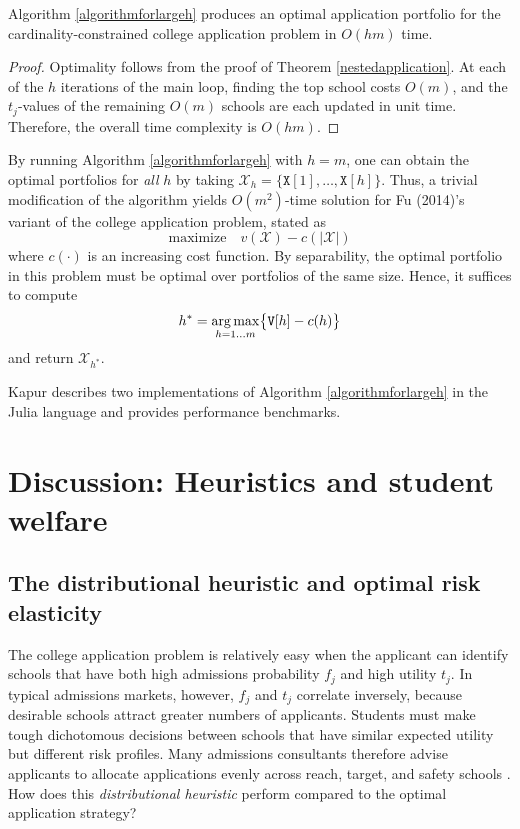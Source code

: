 \begin{theorem} \label{validityofalmaalgorithm}
Algorithm \ref{algorithmforlargeh} produces an optimal application portfolio for the cardinality-constrained college application problem in $O(h m)$ time.
\end{theorem}

\begin{proof}
Optimality follows from the proof of Theorem \ref{nestedapplication}. At each of the $h$ iterations of the main loop, finding the top school costs $O(m)$, and the $t_j$-values of the remaining $O(m)$ schools are each updated in unit time. Therefore, the overall time complexity is $O(h m)$.
\end{proof}

By running Algorithm \ref{algorithmforlargeh} with $h = m$, one can obtain the optimal portfolios for \emph{all} $h$ by taking $\mathcal{X}_h = \{ \mathtt{X}[1], \dots, \mathtt{X}[h]\}$. Thus, a trivial modification of the algorithm yields $O(m^2)$-time solution for Fu (2014)'s variant of the college application problem, stated as 
\[ \text{maximize} \quad v(\mathcal{X}) - c(|\mathcal{X}|)\]
where $c(\cdot)$ is an increasing cost function. By separability, the optimal portfolio in this problem must be optimal over portfolios of the same size. Hence, it suffices to compute
\[h^* = \operatorname*{arg\,max}_{h = 1 \dots m} \bigl\{\mathtt{V}[h] - c(h)\bigr\}\] and return $\mathcal{X}_{h^*}$.  

Kapur \cite{kapur2022} describes two implementations of Algorithm \ref{algorithmforlargeh} in the Julia language and provides performance benchmarks.





\section{Discussion: Heuristics and student welfare} \label{sectionDiscussion}


\subsection{The distributional heuristic and optimal risk elasticity}

The college application problem is relatively easy when the applicant can identify schools that have both high admissions probability $f_j$ and high utility $t_j$. In typical admissions markets, however, $f_j$ and $t_j$ correlate inversely, because desirable schools attract greater numbers of applicants. Students must make tough dichotomous decisions between schools that have similar expected utility but different risk profiles. Many admissions consultants therefore advise applicants to allocate applications evenly across reach, target, and safety schools \cite{jeon2015,peck2021}. How does this \emph{distributional heuristic} perform compared to the optimal application strategy?

